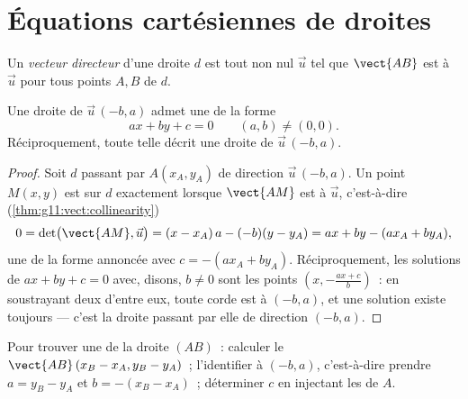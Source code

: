 \section{Équations cartésiennes de droites}

\begin{definition}\label{def:g11:vect:direction}
Un \emph{vecteur directeur} d'une droite $d$ est
tout  non nul $\vec u$ tel que $\vect{AB}$ est  à
$\vec u$ pour tous points $A, B$ de $d$.
\end{definition}

\begin{theorem}\label{thm:g11:vect:cartesian}
Une droite de  $\vec u\,(-b, a)$ admet une  de
la forme
\[
ax + by + c = 0
\qquad (a, b) \neq (0, 0).
\]
Réciproquement, toute telle  décrit une droite de  $\vec u\,(-b, a)$.
\end{theorem}

\begin{proof}
Soit $d$ passant par $A(x_A, y_A)$ de direction $\vec u\,(-b, a)$. Un
point $M(x, y)$ est sur $d$ exactement lorsque $\vect{AM}$ est 
à $\vec u$, c'est-à-dire (\cref{thm:g11:vect:collinearity})
\[
0 = \det\bigl(\vect{AM}, \vec u\bigr)
= (x - x_A)\,a - (-b)(y - y_A)
= ax + by - (a x_A + b y_A),
\]
une  de la forme annoncée avec $c = -(a x_A + b y_A)$.
Réciproquement, les solutions de $ax + by + c = 0$ avec, disons,
$b \neq 0$ sont les points $\left(x, -\frac{a x + c}{b}\right)$~: en
soustrayant deux d'entre eux, toute corde est  à $(-b, a)$, et
une solution existe toujours --- c'est la droite passant par elle de
direction $(-b, a)$.
\end{proof}

\begin{method}\label{met:g11:vect:twopoints}
Pour trouver une  de la droite $(AB)$~: calculer le  $\vect{AB}\,(x_B - x_A, y_B - y_A)$~; l'identifier à $(-b, a)$,
c'est-à-dire prendre $a = y_B - y_A$ et $b = -(x_B - x_A)$~; déterminer
$c$ en injectant les  de $A$.
\end{method}


